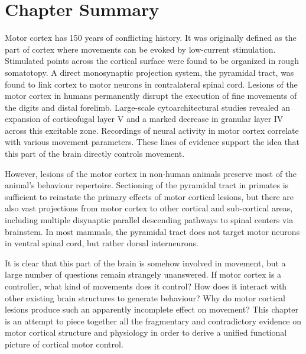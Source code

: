 				
\section{Chapter Summary}

Motor cortex has 150 years of conflicting history. It was originally defined as the part of cortex where movements can be evoked by low-current stimulation. Stimulated points across the cortical surface were found to be organized in rough somatotopy. A direct monosynaptic projection system, the pyramidal tract, was found to link cortex to motor neurons in contralateral spinal cord. Lesions of the motor cortex in humans permanently disrupt the execution of fine movements of the digits and distal forelimb. Large-scale cytoarchitectural studies revealed an expansion of corticofugal layer V and a marked decrease in granular layer IV across this excitable zone. Recordings of neural activity in motor cortex correlate with various movement parameters. These lines of evidence support the idea that this part of the brain directly controls movement.

However, lesions of the motor cortex in non-human animals preserve most of the animal's behaviour repertoire. Sectioning of the pyramidal tract in primates is sufficient to reinstate the primary effects of motor cortical lesions, but there are also vast projections from motor cortex to other cortical and sub-cortical areas, including multiple disynaptic parallel descending pathways to spinal centers via brainstem. In most mammals, the pyramidal tract does not target motor neurons in ventral spinal cord, but rather dorsal interneurons. 

It is clear that this part of the brain is somehow involved in movement, but a large number of questions remain strangely unanswered. If motor cortex is a controller, what kind of movements does it control? How does it interact with other existing brain structures to generate behaviour? Why do motor cortical lesions produce such an apparently incomplete effect on movement? This chapter is an attempt to piece together all the fragmentary and contradictory evidence on motor cortical structure and physiology in order to derive a unified functional picture of cortical motor control.

\pagebreak



